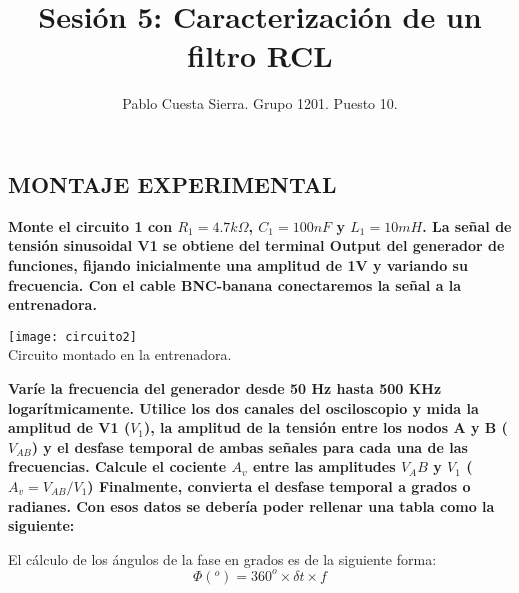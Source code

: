\documentclass{article}
\title{Sesión 5: Caracterización de un filtro RCL}
\date{}
\author{Pablo Cuesta Sierra. Grupo 1201. Puesto 10.}
\begin{document}
\maketitle
\begin{center}
\section*{MONTAJE EXPERIMENTAL}
\end{center}
\textbf{Monte el circuito 1 con $R_1 = 4.7k\Omega$, $C_1 = 100nF$ y $L_1 = 10mH$. La señal de tensión
sinusoidal V1 se obtiene del terminal Output del generador de funciones, fijando inicialmente
una amplitud de 1V y variando su frecuencia. Con el cable BNC-banana conectaremos la señal
a la entrenadora.}\bigskip

\begin{center}
\texttt{[image: circuito2]}\\
Circuito montado en la entrenadora.
\end{center}

\textbf{Varíe la frecuencia del generador desde 50 Hz hasta 500 KHz logarítmicamente. Utilice
los dos canales del osciloscopio y mida la amplitud de V1 ($V_1$), la amplitud de la tensión entre
los nodos A y B ($V_{AB}$) y el desfase temporal de ambas señales para cada una de las frecuencias.
Calcule el cociente $A_v$ entre las amplitudes $V_AB$ y $V_1$ ($A_v=V_{AB}/V_1$) Finalmente, convierta
el desfase temporal a grados o radianes. Con esos datos se debería poder rellenar una tabla como
la siguiente:}

El cálculo de los ángulos de la fase en grados es de la siguiente forma:
$$\Phi (^o)=360^o\times \delta t \times f$$
\cleardoublepage
\end{document}

